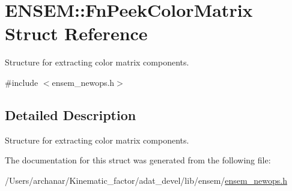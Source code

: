 \hypertarget{structENSEM_1_1FnPeekColorMatrix}{}\section{E\+N\+S\+EM\+:\+:Fn\+Peek\+Color\+Matrix Struct Reference}
\label{structENSEM_1_1FnPeekColorMatrix}


Structure for extracting color matrix components.  




{\ttfamily \#include $<$ensem\+\_\+newops.\+h$>$}



\subsection{Detailed Description}
Structure for extracting color matrix components. 

The documentation for this struct was generated from the following file\+:\begin{DoxyCompactItemize}
\item 
/\+Users/archanar/\+Kinematic\+\_\+factor/adat\+\_\+devel/lib/ensem/\mbox{\hyperlink{lib_2ensem_2ensem__newops_8h}{ensem\+\_\+newops.\+h}}\end{DoxyCompactItemize}
